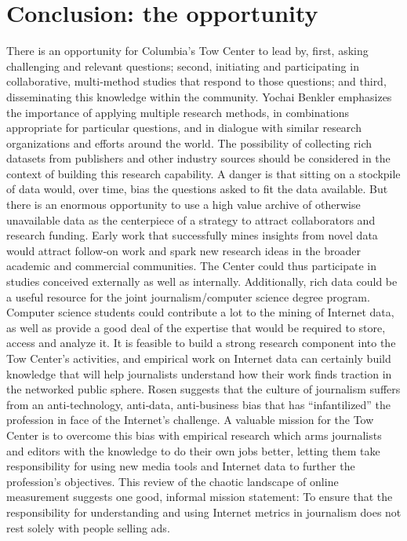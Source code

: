 \section{Conclusion: the opportunity}
There is an opportunity for Columbia’s Tow Center to lead by, first,
asking challenging and relevant questions; second, initiating and
participating in collaborative, multi‐method studies that respond to those
questions; and third, disseminating this knowledge within the
community. Yochai Benkler emphasizes the importance of applying
multiple research methods, in combinations appropriate for particular
questions, and in dialogue with similar research organizations and efforts
around the world.
The possibility of collecting rich datasets from publishers and other
industry sources should be considered in the context of building this
research capability. A danger is that sitting on a stockpile of data would,
over time, bias the questions asked to fit the data available. But there is an
enormous opportunity to use a high value archive of otherwise
unavailable data as the centerpiece of a strategy to attract collaborators
and research funding. Early work that successfully mines insights from
novel data would attract follow‐on work and spark new research ideas in
the broader academic and commercial communities. The Center could
thus participate in studies conceived externally as well as internally.
Additionally, rich data could be a useful resource for the joint
journalism/computer science degree program. Computer science students
could contribute a lot to the mining of Internet data, as well as provide a
good deal of the expertise that would be required to store, access and
analyze it.
It is feasible to build a strong research component into the Tow Center’s
activities, and empirical work on Internet data can certainly build
knowledge that will help journalists understand how their work finds
traction in the networked public sphere. Rosen suggests that the culture of
journalism suffers from an anti‐technology, anti‐data, anti‐business bias
that has ``infantilized'' the profession in face of the Internet’s challenge. A
valuable mission for the Tow Center is to overcome this bias with
empirical research which arms journalists and editors with the knowledge
to do their own jobs better, letting them take responsibility for using new
media tools and Internet data to further the profession’s objectives. This
review of the chaotic landscape of online measurement suggests one good,
informal mission statement: To ensure that the responsibility for
understanding and using Internet metrics in journalism does not rest
solely with people selling ads.

